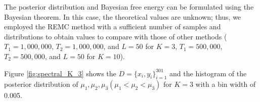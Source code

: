 \documentclass[12pt]{article}
\begin{document}
The posterior distribution and Bayesian free energy can be formulated using the Bayesian theorem.
In this case, the theoretical values are unknown; thus, we employed the REMC method with a sufficient number of samples and distributions to obtain values to compare with those of other methods
($T_1 = 1{,}000{,}000$, $T_2 = 1{,}000{,}000$, and $L = 50$ for $K = 3$, $T_1 = 500{,}000$, $T_2 = 500{,}000$, and $L = 50$ for $K = 10$). \par
Figure \ref{fig:spectral_K_3} shows the $D = \{x_i,y_i\}_{i=1}^{301}$ and the histogram of the posterior distribution of $\mu_1, \mu_2, \mu_3 (\mu_1< \mu_2< \mu_3)$ for $K = 3$ with a bin width of 0.005.
\end{document}
